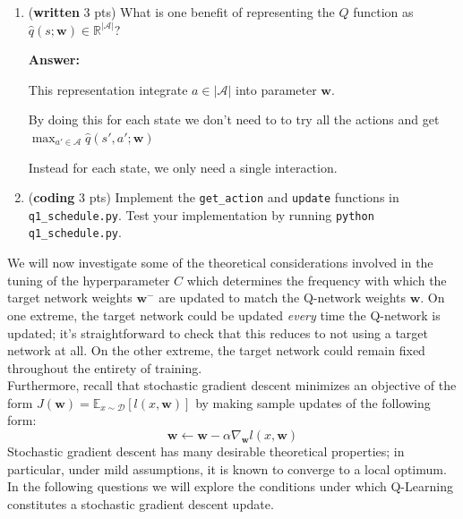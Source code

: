 \documentclass{article}
\begin{document}
\begin{enumerate}

\item (\textbf{written} 3 pts) What is one benefit of representing the $Q$ function as $\hat{q}(s; \mathbf{w}) \in \mathbb{R}^{|\mathcal{A}|}$?

\textbf{Answer:}

This representation integrate $a \in |\mathcal{A}|$ into parameter $\mathbf{w}$.

By doing this for each state we don't need to to try all the actions and get $\max_{a' \in \mathcal{A}}\hat{q}\left(s', a'; \mathbf{w} \right)$

Instead for each state, we only need a single interaction.


\item (\textbf{coding} 3 pts) Implement the \texttt{get\_action} and \texttt{update} functions in \texttt{q1\_schedule.py}. Test your implementation by running \texttt{python q1\_schedule.py}.
\end{enumerate}

We will now investigate some of the theoretical considerations involved in the tuning of the hyperparameter $C$ which determines the frequency with which the target network weights $\mathbf{w^-}$ are updated to match the Q-network weights $\mathbf{w}$. On one extreme, the target network could be updated \textit{every} time the Q-network is updated; it's straightforward to check that this reduces to not using a target network at all. On the other extreme, the target network could remain fixed throughout the entirety of training.\\

Furthermore, recall that stochastic gradient descent minimizes an objective of the form $J(\mathbf{w}) = \mathbb{E}_{x \sim \mathcal{D}}[l(x,\mathbf{w})]$ by making sample updates of the following form:
\[
\mathbf{w} \leftarrow \mathbf{w} - \alpha \nabla_{\mathbf{w}}l(x,\mathbf{w})
\]
Stochastic gradient descent has many desirable theoretical properties; in particular, under mild assumptions, it is known to converge to a local optimum. In the following questions we will explore the conditions under which Q-Learning constitutes a stochastic gradient descent update.
\end{document}

